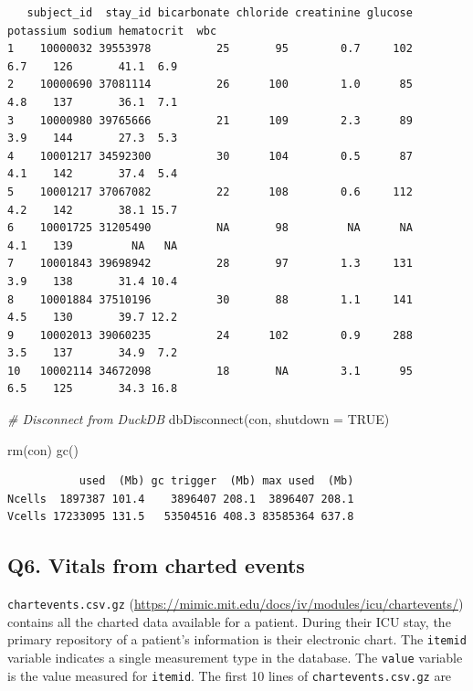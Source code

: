 \documentclass[
]{article}
\newenvironment{Shaded}{\begin{snugshade}}{\end{snugshade}}
\newcommand{\AttributeTok}[1]{\textcolor[rgb]{0.77,0.63,0.00}{#1}}
\newcommand{\CommentTok}[1]{\textcolor[rgb]{0.56,0.35,0.01}{\textit{#1}}}
\newcommand{\ConstantTok}[1]{\textcolor[rgb]{0.00,0.00,0.00}{#1}}
\newcommand{\FunctionTok}[1]{\textcolor[rgb]{0.00,0.00,0.00}{#1}}
\newcommand{\NormalTok}[1]{\textcolor[rgb]{0.00,0.00,0.00}{#1}}
\begin{document}
\begin{verbatim}
   subject_id  stay_id bicarbonate chloride creatinine glucose potassium sodium hematocrit  wbc
1    10000032 39553978          25       95        0.7     102       6.7    126       41.1  6.9
2    10000690 37081114          26      100        1.0      85       4.8    137       36.1  7.1
3    10000980 39765666          21      109        2.3      89       3.9    144       27.3  5.3
4    10001217 34592300          30      104        0.5      87       4.1    142       37.4  5.4
5    10001217 37067082          22      108        0.6     112       4.2    142       38.1 15.7
6    10001725 31205490          NA       98         NA      NA       4.1    139         NA   NA
7    10001843 39698942          28       97        1.3     131       3.9    138       31.4 10.4
8    10001884 37510196          30       88        1.1     141       4.5    130       39.7 12.2
9    10002013 39060235          24      102        0.9     288       3.5    137       34.9  7.2
10   10002114 34672098          18       NA        3.1      95       6.5    125       34.3 16.8
\end{verbatim}

\begin{Shaded}
\begin{Highlighting}[]
\CommentTok{\# Disconnect from DuckDB}
\FunctionTok{dbDisconnect}\NormalTok{(con, }\AttributeTok{shutdown =} \ConstantTok{TRUE}\NormalTok{)}

\FunctionTok{rm}\NormalTok{(con)}
\FunctionTok{gc}\NormalTok{()}
\end{Highlighting}
\end{Shaded}

\begin{verbatim}
           used  (Mb) gc trigger  (Mb) max used  (Mb)
Ncells  1897387 101.4    3896407 208.1  3896407 208.1
Vcells 17233095 131.5   53504516 408.3 83585364 637.8
\end{verbatim}

\hypertarget{q6.-vitals-from-charted-events}{%
\subsection{Q6. Vitals from charted
events}\label{q6.-vitals-from-charted-events}}

\texttt{chartevents.csv.gz}
(\url{https://mimic.mit.edu/docs/iv/modules/icu/chartevents/}) contains
all the charted data available for a patient. During their ICU stay, the
primary repository of a patient's information is their electronic chart.
The \texttt{itemid} variable indicates a single measurement type in the
database. The \texttt{value} variable is the value measured for
\texttt{itemid}. The first 10 lines of \texttt{chartevents.csv.gz} are
\end{document}

